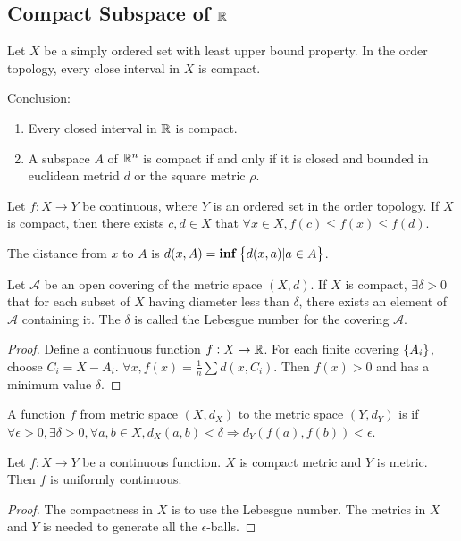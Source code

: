\subsection{Compact Subspace of $\mathbb{R}$}

\begin{theorem}
    Let $X$ be a simply ordered set with least upper bound property. In the order topology, every close interval in $X$ is compact.    
    
    Conclusion:
    \begin{enumerate}
        \item Every closed interval in $\mathbb{R}$ is compact.
        \item A subspace $A$ of $\mathbb{R}^n$ is compact if and only if it is closed and bounded in euclidean metrid $d$ or the square metric $\rho$.
    \end{enumerate}
\end{theorem}

\begin{theorem}
    Let $f: X \rightarrow Y$ be continuous, where $Y$ is an ordered set in the order topology. If $X$ is compact, then there exists $c,d \in X$ that $\forall x \in X, f(c) \leq f(x) \leq f(d)$.
\end{theorem}

\begin{definition}
    The distance from $x$ to $A$ is $d(x,A) = \mathbf{inf} \set{d(x,a) | a \in A}$.
\end{definition}

\begin{theorem}
    Let $\mathcal{A}$ be an open covering of the metric space $(X, d)$. If $X$ is compact, $\exists \delta > 0$ that for each subset of $X$ having diameter less than $\delta$, there exists an element of $\mathcal{A}$ containing it. The $\delta$ is called the Lebesgue number for the covering $\mathcal{A}$.
\end{theorem}
\begin{proof}
    Define a continuous function $f : X \rightarrow \mathbb{R}$. For each finite covering $\set{A_i}$, choose $C_i = X - A_i$. $\forall x, f(x) = \frac{1}{n} \sum d(x,C_i)$. Then $f(x) > 0$ and has a minimum value $\delta$.
\end{proof}

\begin{definition}
    A function $f$ from metric space $(X, d_X)$ to the metric space $(Y, d_Y)$ is  if $\forall \epsilon > 0, \exists \delta > 0, \forall a,b \in X, d_X (a,b) < \delta \Rightarrow d_Y \left(f(a), f(b)\right) < \epsilon$.
\end{definition}
\begin{theorem}
    Let $f: X \rightarrow Y$ be a continuous function. $X$ is compact metric and $Y$ is metric. Then $f$ is uniformly continuous.    
\end{theorem}
\begin{proof}
    The compactness in $X$ is to use the Lebesgue number. The metrics in $X$ and $Y$ is needed to generate all the $\epsilon$-balls.
\end{proof}



